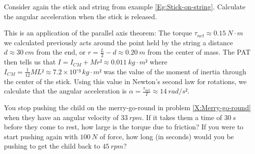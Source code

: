 \begin{example}
Consider again the stick and string from example \ref{Eg:Stick-on-string}. Calculate the angular acceleration when the stick is released. 
\begin{solution}
This is an application of the parallel axis theorem: The torque $τ_{net}≈ 0.15\ N\cdot m$ we calculated previously acts around the point held by the string a distance $d≈ 30\ cm$ from the end, or $r=\frac L2-d ≈0.20\ m$ from the center of mass. The PAT then tells us that $I=I_{CM}+Mr² ≈ 0.011\ kg \cdot m²$ where $I_{CM} = \frac 1{12} ML² ≈ 7.2 × 10⁻³\ kg\cdot m²$ was the value of the moment of inertia through the center of the stick.  Using this value in Newton's second law for rotations, we calculate that the angular acceleration is 
$
α =\frac{τ_{net} }{I}≈ 14\ rad/s²
$.
\end{solution}
\end{example}

\begin{exercise} 
You stop pushing the child on the merry-go-round in problem \ref{X:Merry-go-round} when they have an angular velocity of $33\ rpm$. If it takes them a time of $30\ s$ before they come to rest, how large is the torque due to friction? 
If you were to start pushing again with $100\ N$ of force, how long (in seconds) would you be pushing to get the child back to $45\ rpm$? 
\end{exercise}




